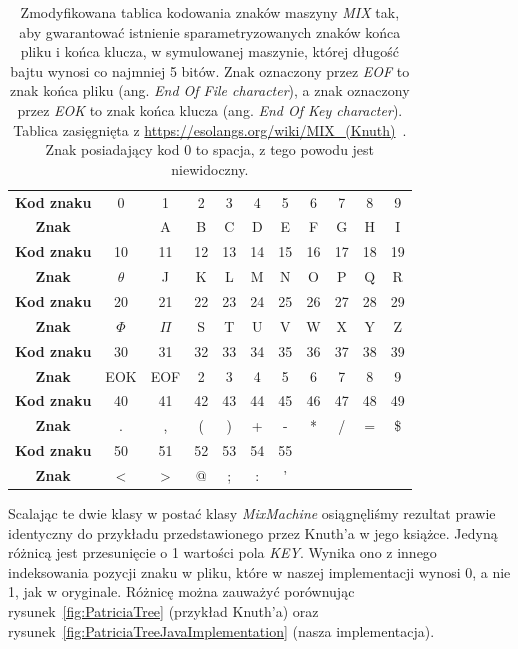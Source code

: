 	    \begin{table}[htb]
			\centering
			\begin{threeparttable}
				\caption{Zmodyfikowana tablica kodowania znaków maszyny \emph{MIX} tak, aby gwarantować istnienie sparametryzowanych znaków końca pliku i końca klucza, w symulowanej maszynie, której długość bajtu wynosi co najmniej 5 bitów. Znak oznaczony przez \emph{EOF} to znak końca pliku (ang. \emph{End Of File character}), a znak oznaczony przez \emph{EOK} to znak końca klucza (ang. \emph{End Of Key character}). Tablica zasięgnięta z \url{https://esolangs.org/wiki/MIX_(Knuth)}~\cite{wikiMix}. Znak posiadający kod 0 to spacja, z tego powodu jest niewidoczny.}\label{tab:ModifiedMixMachineEncodingTable}
				{ \small
					\begin{tabularx}{0.96\textwidth}{C{5}|C{2}|C{2}|C{2}|C{2}|C{2}|C{2}|C{2}|C{2}|C{2}|C{2}|}
						\textbf{Kod znaku} & 0 & 1 & 2 & 3 & 4 & 5 & 6 & 7 & 8 & 9 \\
						\textbf{Znak}      &   & A & B & C & D & E & F & G & H & I \\
						\hline \hline
						\textbf{Kod znaku} & 10 & 11 & 12 & 13 & 14 & 15 & 16 & 17 & 18 & 19 \\
						\textbf{Znak}      &$\theta$& J & K & L & M & N & O & P & Q & R \\
						\hline \hline
						\textbf{Kod znaku} & 20 & 21 & 22 & 23 & 24 & 25 & 26 & 27 & 28 & 29 \\
						\textbf{Znak}      &$\Phi$&$\Pi$& S & T & U & V & W & X & Y & Z \\
						\hline \hline
						\textbf{Kod znaku} & 30 & 31 & 32 & 33 & 34 & 35 & 36 & 37 & 38 & 39 \\
						\textbf{Znak}      & EOK & EOF & 2 & 3 & 4 & 5 & 6 & 7 & 8 & 9 \\
						\hline \hline
						\textbf{Kod znaku} & 40 & 41 & 42 & 43 & 44 & 45 & 46 & 47 & 48 & 49 \\
						\textbf{Znak}      & . & , & ( & ) & + & - & * & / & = & \$ \\
						\hline \hline
						\textbf{Kod znaku} & 50 & 51 & 52 & 53 & 54 & 55 & & & & \\
						\textbf{Znak}      & < & > & @ & ; & : & ' & & & & \\
						\hline \hline
					\end{tabularx} 
				}
			\end{threeparttable}
		\end{table}
	    
	    Scalając te dwie klasy w postać klasy \emph{MixMachine} osiągnęliśmy rezultat prawie identyczny do przykładu przedstawionego przez Knuth'a w jego książce. Jedyną różnicą jest przesunięcie o 1 wartości pola \emph{KEY}. Wynika ono z innego indeksowania pozycji znaku w pliku, które w naszej implementacji wynosi 0, a nie 1, jak w oryginale. Różnicę można zauważyć porównując rysunek~\ref{fig:PatriciaTree} (przykład Knuth'a) oraz rysunek~\ref{fig:PatriciaTreeJavaImplementation} (nasza implementacja).
	    
